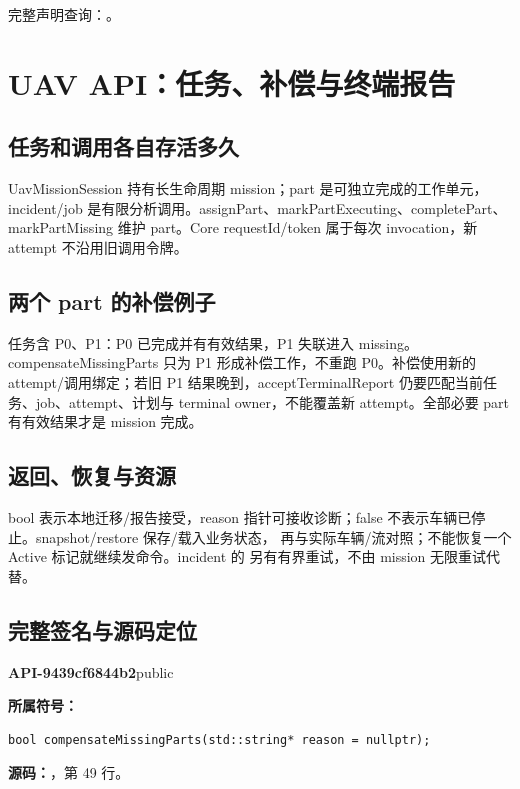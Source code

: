 完整声明查询：。

\section{UAV API：任务、补偿与终端报告}

\subsection{任务和调用各自存活多久}
UavMissionSession 持有长生命周期 mission；part 是可独立完成的工作单元，incident/job 是有限分析调用。assignPart、markPartExecuting、completePart、markPartMissing 维护 part。Core requestId/token 属于每次 invocation，新 attempt 不沿用旧调用令牌。

\subsection{两个 part 的补偿例子}
任务含 P0、P1：P0 已完成并有有效结果，P1 失联进入 missing。compensateMissingParts 只为 P1 形成补偿工作，不重跑 P0。补偿使用新的 attempt/调用绑定；若旧 P1 结果晚到，acceptTerminalReport 仍要匹配当前任务、job、attempt、计划与 terminal owner，不能覆盖新 attempt。全部必要 part 有有效结果才是 mission 完成。

\subsection{返回、恢复与资源}
bool 表示本地迁移/报告接受，reason 指针可接收诊断；false 不表示车辆已停止。snapshot/restore 保存/载入业务状态， 再与实际车辆/流对照；不能恢复一个 Active 标记就继续发命令。incident 的  另有有界重试，不由 mission 无限重试代替。

\subsection{完整签名与源码定位}

\textbf{API-9439cf6844b2}\quad public\par
\textbf{所属符号：}\par
\begin{Verbatim}[fontsize=\footnotesize,breaklines,breakanywhere]
bool compensateMissingParts(std::string* reason = nullptr);
\end{Verbatim}
\textbf{源码：}，第 49 行。\par

